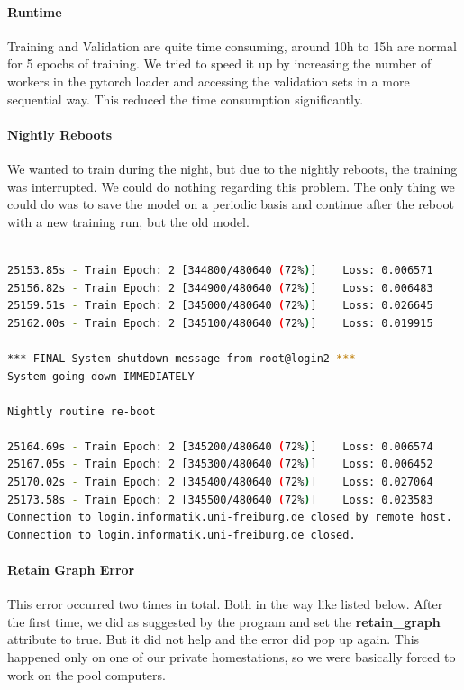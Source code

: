 \documentclass[a4paper]{article}
\begin{document}
	\paragraph{Runtime} Training and Validation are quite time consuming, around 10h to 15h are normal for 5 epochs of training. We tried to speed it up by increasing the number of workers in the pytorch loader and accessing the validation sets in a more sequential way. This reduced the time consumption significantly.
	\paragraph{Nightly Reboots} We wanted to train during the night, but due to the nightly reboots, the training was interrupted. We could do nothing regarding this problem. The only thing we could do was to save the model on a periodic basis and continue after the reboot with a new training run, but the old model.
	
\begin{lstlisting}[language=bash, caption={Nigthly Reboot Interruption}]

25153.85s - Train Epoch: 2 [344800/480640 (72%)]    Loss: 0.006571
25156.82s - Train Epoch: 2 [344900/480640 (72%)]    Loss: 0.006483
25159.51s - Train Epoch: 2 [345000/480640 (72%)]    Loss: 0.026645
25162.00s - Train Epoch: 2 [345100/480640 (72%)]    Loss: 0.019915
                                                                               
*** FINAL System shutdown message from root@login2 ***                       
System going down IMMEDIATELY                                                  
                                                                               
Nightly routine re-boot                                                        
                                                                               
25164.69s - Train Epoch: 2 [345200/480640 (72%)]    Loss: 0.006574
25167.05s - Train Epoch: 2 [345300/480640 (72%)]    Loss: 0.006452
25170.02s - Train Epoch: 2 [345400/480640 (72%)]    Loss: 0.027064
25173.58s - Train Epoch: 2 [345500/480640 (72%)]    Loss: 0.023583
Connection to login.informatik.uni-freiburg.de closed by remote host.
Connection to login.informatik.uni-freiburg.de closed.

\end{lstlisting}

\paragraph{Retain Graph Error} This error occurred two times in total. Both in the way like listed below. After the first time, we did as suggested by the program and set the \textbf{retain\_graph} attribute to true. But it did not help and the error did pop up again. This happened only on one of our private homestations, so we were basically forced to work on the pool computers.
\end{document}
